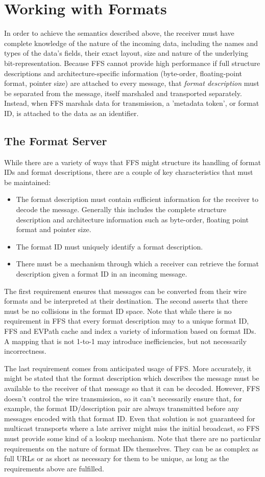 \section{Working with Formats\label{sec:formats}}
In order to achieve the semantics described above, the receiver must have
complete knowledge of the nature of the incoming data, including the names
and types of the data's fields, their exact layout, size and nature of the
underlying bit-representation.  Because FFS cannot provide high performance
if full structure descriptions and architecture-specific information
(byte-order, floating-point format, pointer size) are attached to every
message, that {\it format description} must be separated from the message,
itself marshaled and transported separately.  Instead, when FFS marshals
data for transmission, a 'metadata token', or format ID, is attached to the
data as an identifier.

\subsection{The Format Server}
While there are a variety of ways that FFS might structure its handling of
format IDs and format descriptions, there are a couple of key
characteristics that must be maintained:
\begin{itemize}
\item The format description must contain sufficient information for the
  receiver to decode the message.  Generally this includes the complete
  structure description and architecture information such as byte-order,
  floating point format and pointer size.
\item The format ID must uniquely identify a format description.
\item There must be a mechanism through which a receiver can retrieve the
  format description given a format ID in an incoming message.
\end{itemize}
The first requirement ensures that messages can be converted from their wire
formats and be interpreted at their destination.  The second asserts that
there must be no collisions in the format ID space.  Note that while there
is no requirement in FFS that every format description may to a unique
format ID, FFS and EVPath cache and index a variety of information based on
format IDs.  A mapping that is not 1-to-1 may introduce inefficiencies, but
not necessarily incorrectness.  

The last requirement comes from anticipated usage of FFS.  More accurately,
it might be stated that the format description which describes the message
must be available to the receiver of that message so that it can be decoded.
However, FFS doesn't control the wire transmission, so it can't necessarily
ensure that, for example, the format ID/description pair are always
transmitted before any messages encoded with that format ID.  Even that
solution is not guaranteed for multicast transports where a late arriver
might miss the initial broadcast, so FFS must provide some kind of a lookup
mechanism.  Note that there are no particular requirements on the nature of
format IDs themselves.  They can be as complex as full URLs or as short as
necessary for them to be unique, as long as the requirements above are
fulfilled.

